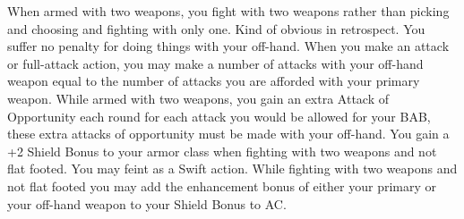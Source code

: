 \combatfeat
{When armed with two weapons, you fight with two weapons rather than picking and choosing and fighting with only one. Kind of obvious in retrospect.}
{You suffer no penalty for doing things with your off-hand. When you make an attack or full-attack action, you may make a number of attacks with your off-hand weapon equal to the number of attacks you are afforded with your primary weapon.}
{While armed with two weapons, you gain an extra Attack of Opportunity each round for each attack you would be allowed for your BAB, these extra attacks of opportunity must be made with your off-hand.}
{You gain a +2 Shield Bonus to your armor class when fighting with two weapons and not flat footed.}
{You may feint as a Swift action.}
{While fighting with two weapons and not flat footed you may add the enhancement bonus of either your primary or your off-hand weapon to your Shield Bonus to AC.}